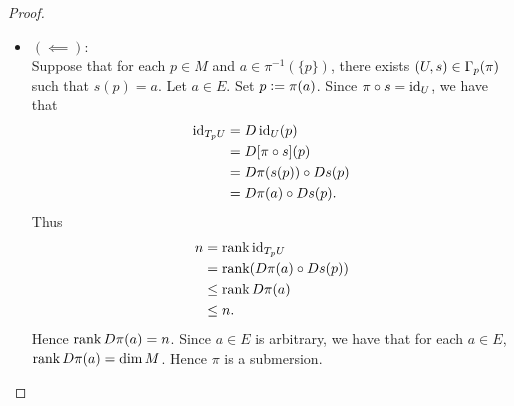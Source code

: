 \documentclass{book}
\begin{document}
\begin{proof}
\begin{itemize}
			\begin{align*}
				\pi \circ s (q)
				& = [\pi \circ (\psi^{-1} \circ \hat{s} \circ \phi|_{\phi^{-1}(A)})] (q) \\
				& = [\pi \circ (\psi^{-1} \circ \hat{s} \circ \phi|_{\phi^{-1}(A)})] (\phi^{-1}(x)) \\
				& = [\pi \circ (\psi^{-1} \circ \hat{s})] (x) \\
				& = [(\pi \circ \psi^{-1}) \circ \hat{s}] (x) \\
				& = (\phi^{-1} \circ \prj^{n+k}_{[n]}) (x, \hat{y}) \\
				& = \phi^{-1}(x) \\
				& = q
			\end{align*}
			Since $q \in \phi^{-1}(A)$ is arbitrary, we have that $\pi \circ s = \id_{\phi^{-1}(A)}$ and therefore $(\phi^{-1}(A), s) \in \Gam_{p}(\pi)$. By construction, 
			\begin{align*}
				s(p)
				 & = \psi^{-1} \circ \hat{s} \circ \phi(p) \\
				 & = \psi^{-1} \circ \hat{s}(\hat{x}) \\
				 & = \psi^{-1}(\hat{x}, \hat{y}) \\
				 & = \psi^{-1}(\psi(a)) \\
				 & = a.
			\end{align*}
			\item $(\impliedby):$ \\
			Suppose that for each $p \in M$ and $a \in \pi^{-1}(\{p\})$, there exists $(U, s) \in \Gamma_p(\pi)$ such that $s(p) = a$. Let $a \in E$. Set $p \vcentcolon= \pi(a)$. Since $\pi \circ s = \operatorname{id}_U$, we have that 
			\begin{align*}
				\operatorname{id}_{T_pU}
				& = D \operatorname{id}_U (p) \\
				& = D[ \pi \circ s](p) \\
				& = D\pi(s(p)) \circ D s(p) \\
				& = D \pi(a) \circ D s(p).
			\end{align*}
			Thus 
			\begin{align*}
				n
				& = \operatorname{\text{rank}} \operatorname{id}_{T_pU} \\
				& = \operatorname{\text{rank}} (D \pi(a) \circ D s(p)) \\
				& \leq \operatorname{\text{rank}} D \pi(a) \\
				& \leq n.
			\end{align*}
			Hence $\operatorname{\text{rank}} D \pi(a) = n$. Since $a \in E$ is arbitrary, we have that for each $a \in E$, $\operatorname{\text{rank}} D \pi(a) = \dim M$. Hence $\pi$ is a submersion. 
		\end{itemize}
	\end{proof}
\end{document}
